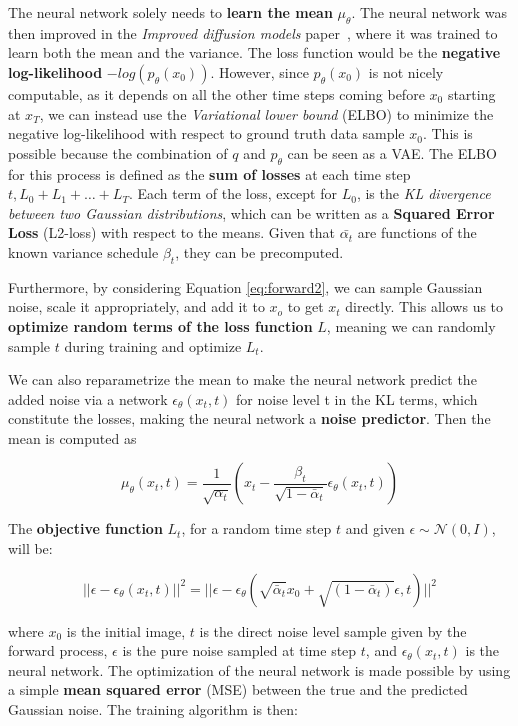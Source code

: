 \documentclass[preprint]{elsarticle}
\begin{document}
The neural network solely needs to \textbf{learn the mean} $\mu_\theta$.
The neural network was then improved in the \emph{Improved diffusion models} paper~\cite{nichol2021improved}, where it was trained to learn both the mean and the variance.
The loss function would be the \textbf{negative log-likelihood} $-log(p_\theta(x_0))$. 
However, since $p_\theta(x_0)$ is not nicely computable, as it depends on all the other time steps coming before  $x_0$ starting at $x_T$, we can instead use the \emph{Variational lower bound} (ELBO) 
to minimize the negative log-likelihood with respect to ground truth data sample $x_0$.
This is possible because the combination of $q$ and $p_\theta$ can be seen as a VAE.
The ELBO for this process is defined as the \textbf{sum of losses} at each time step $t, L_0 + L_1 + \dots + L_T$.
Each term of the loss, except for $L_0$, is the \emph{KL divergence between two Gaussian distributions},
which can be written as a \textbf{Squared Error Loss} (L2-loss) with respect to the means.
Given that $\bar{\alpha_t}$ are functions of the known variance schedule $\beta_t$, they can be precomputed.

Furthermore, by considering Equation \ref{eq:forward2}, we can sample Gaussian noise, 
scale it appropriately, and add it to $x_o$ to  get $x_t$ directly. This allows us
to \textbf{optimize random terms of the loss function} $L$, meaning we can randomly sample $t$ during training and optimize $L_t$.

We can also reparametrize the mean to make the neural network predict
the added noise via a network $\epsilon_\theta(x_t,t)$ for noise level t in the KL terms, which
constitute the losses, making the neural network a \textbf{noise predictor}.
Then the mean is computed as \cite{weng2021diffusion}

\begin{equation}
	\mu_\theta(x_t,t) =\frac{1}{\sqrt{\alpha_t}}\left(x_t - \frac{\beta_t}{\sqrt{1-\bar{\alpha}_t}}\epsilon_\theta(x_t,t)\right)
\end{equation}

The \textbf{objective function} $L_t$, for a random time step $t$ and given $\epsilon \sim \mathcal{N}(0,I)$, will be:

\begin{equation}
	||\epsilon-\epsilon_\theta(x_t,t)||^2 = ||\epsilon - \epsilon_\theta
	(\sqrt{\bar{\alpha}_t}x_0 + \sqrt{(1-\bar{\alpha}_t)}\epsilon,t) ||^2
\end{equation}

where $x_0$ is the initial image, $t$ is the direct noise level sample given by the
forward process, $\epsilon$ is the pure noise sampled at time step $t$, and 
$\epsilon_\theta(x_t,t)$ is the neural network. The optimization of the neural network is made possible 
by using a simple \textbf{mean squared error} (MSE) between the true and the predicted Gaussian noise. The training algorithm is then:
\end{document}

